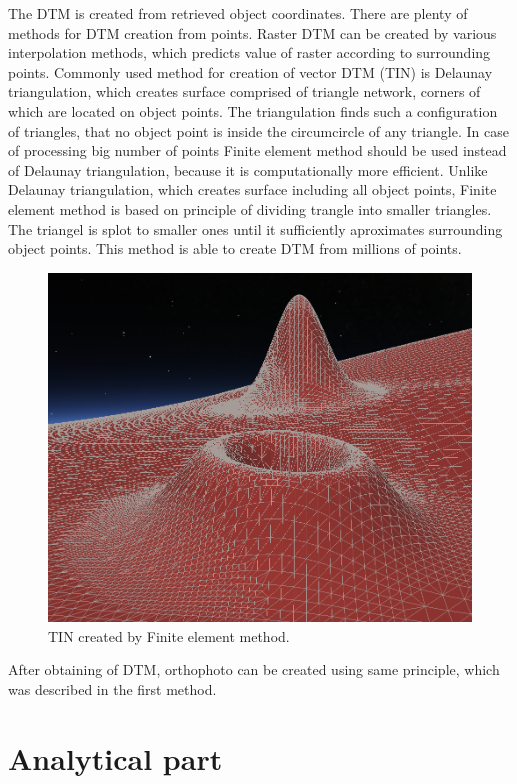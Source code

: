 \documentclass[a4paper,12pt]{article}
\begin{document}
The DTM is created from retrieved object coordinates. There 
are plenty of methods for DTM creation from points. Raster DTM can be created by various interpolation methods, 
which predicts value of raster according to surrounding points. Commonly used method for  creation of 
vector DTM (TIN) is Delaunay triangulation, which creates surface comprised of triangle network, corners of which are located 
on object points. The triangulation finds such a configuration of triangles, that no object 
point is inside the circumcircle of any triangle.
In case of processing big number of points Finite element method 
should be used instead of Delaunay triangulation, because it is computationally more efficient.
Unlike Delaunay triangulation, which creates surface including all object points, Finite element method
is based on principle of dividing trangle into smaller triangles. 
The triangel is splot to smaller ones until it sufficiently aproximates surrounding object points. 
This method is able to create DTM from millions of points.

\begin{figure}[h]
    \centering
    \includegraphics[scale=0.2]{figures/finite_elements.png}
    \caption{TIN created by Finite element method.}
    \label{fig:rel_or_amb}
\end{figure}

After obtaining of DTM, orthophoto can be created using same principle, which was described in the first method. 

\section{Analytical part}
\end{document}
